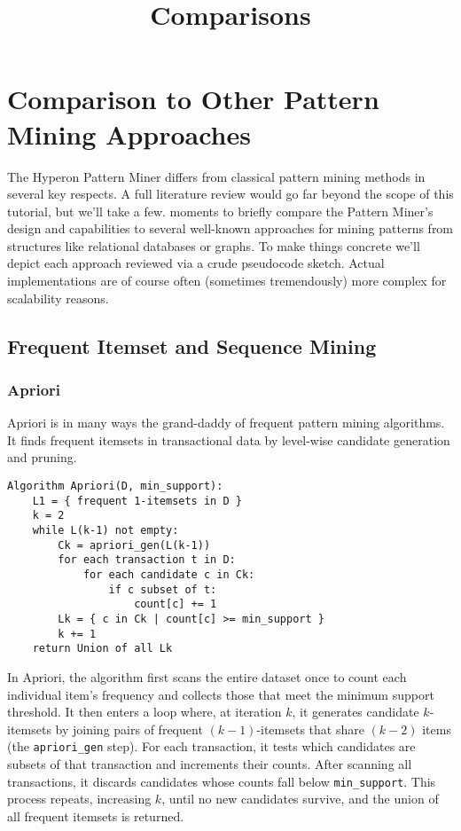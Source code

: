 \documentclass{article}
\title{Comparisons}
\begin{document}
\section{Comparison to Other Pattern Mining Approaches}

The Hyperon Pattern Miner differs from classical pattern mining methods in several key respects.   A full literature review would go far beyond the scope of this tutorial, but we'll take a few. moments to briefly compare the Pattern Miner's design and capabilities to several well-known approaches for mining patterns from structures like relational databases or graphs.   To make things concrete we'll depict each approach reviewed via a crude pseudocode sketch.  Actual implementations are of course often (sometimes tremendously) more complex for scalability reasons.


\subsection{Frequent Itemset and Sequence Mining}
\subsubsection{Apriori}

Apriori \cite{agrawal1994fast} is in many ways the grand-daddy of frequent pattern mining algorithms.  It finds frequent itemsets in transactional data by level-wise candidate generation and pruning.

\begin{verbatim}
Algorithm Apriori(D, min_support):
    L1 = { frequent 1-itemsets in D }
    k = 2
    while L(k-1) not empty:
        Ck = apriori_gen(L(k-1))
        for each transaction t in D:
            for each candidate c in Ck:
                if c subset of t:
                    count[c] += 1
        Lk = { c in Ck | count[c] >= min_support }
        k += 1
    return Union of all Lk
\end{verbatim}

In Apriori, the algorithm first scans the entire dataset once to count each individual item's frequency and collects those that meet the minimum support threshold.  It then enters a loop where, at iteration \(k\), it generates candidate \(k\)-itemsets by joining pairs of frequent \((k-1)\)-itemsets that share \((k-2)\) items (the \texttt{apriori\_gen} step).  For each transaction, it tests which candidates are subsets of that transaction and increments their counts.  After scanning all transactions, it discards candidates whose counts fall below \texttt{min\_support}.  This process repeats, increasing \(k\), until no new candidates survive, and the union of all frequent itemsets is returned.
\end{document}
